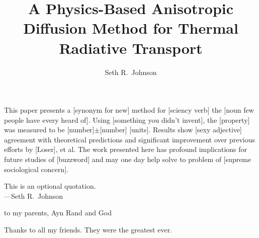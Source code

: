 \documentclass[12pt, letterpaper]{umthesis}
\author{Seth R.~Johnson}
\title{A Physics-Based Anisotropic Diffusion Method for Thermal Radiative Transport}
\begin{document}
\frontmatter

\maketitle

\begin{finalabstract}
  This paper presents a [synonym for new] method for [sciency verb] the [noun
  few people have every heard of]. Using [something you didn't invent],
  the [property] was measured to be [number]$\pm$[number] [units].
  Results show [sexy adjective] agreement with theoretical predictions and
  significant improvement over previous efforts by [Loser], et al. The work
  presented here has profound implications for future studies of [buzzword] and
  may one day help solve to problem of [supreme sociological concern].
\end{finalabstract}
\makecopyright

\begin{frontispiece}
  This is an optional quotation.\\
  ---Seth R.~Johnson
\end{frontispiece}

\begin{dedication}
  to my parents, Ayn Rand and God
\end{dedication}

\begin{acknowledgments}
  Thanks to all my friends. They were the greatest ever.
\end{acknowledgments}


\tableofcontents
\listoftables
\listoffigures
\listofappendices


\mainmatter





\appendix


\backmatter


\end{document}
